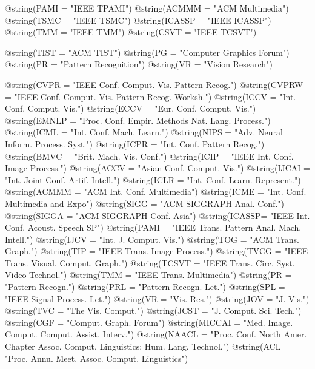@string(PAMI = "{IEEE TPAMI}")
@string(ACMMM	= "{ACM Multimedia}")
@string(TSMC = "{IEEE TSMC}")
@string(ICASSP = "{IEEE ICASSP}")
@string(TMM	= "{IEEE TMM}")
@string(CSVT = "{IEEE TCSVT}")

@string(TIST = "{ACM TIST}")
@string(PG = "{Computer Graphics Forum}")
@string(PR = "{Pattern Recognition}")
@string(VR = "{Vision Research}")

@string(CVPR  = "{IEEE Conf. Comput. Vis. Pattern Recog.}")
@string(CVPRW = "{IEEE Conf. Comput. Vis. Pattern Recog. Worksh.}")
@string(ICCV  = "{Int. Conf. Comput. Vis.}")
@string(ECCV  = "{Eur. Conf. Comput. Vis.}")
@string(EMNLP  = "{Proc. Conf. Empir. Methods Nat. Lang. Process.}")
@string(ICML  = "{Int. Conf. Mach. Learn.}")
@string(NIPS  = "{Adv. Neural Inform. Process. Syst.}")
@string(ICPR  = "{Int. Conf. Pattern Recog.}")
@string(BMVC  = "{Brit. Mach. Vis. Conf.}")
@string(ICIP  = "{IEEE Int. Conf. Image Process.}")
@string(ACCV  = "{Asian Conf. Comput. Vis.}")
@string(IJCAI = "{Int. Joint Conf. Artif. Intell.}")
@string(ICLR  = "{Int. Conf. Learn. Represent.}")
@string(ACMMM = "{ACM Int. Conf. Multimedia}")
@string(ICME  = "{Int. Conf. Multimedia and Expo}")
@string(SIGG  = "{ACM SIGGRAPH Anal. Conf.}")
@string(SIGGA = "{ACM SIGGRAPH Conf. Asia}")
@string(ICASSP=	"{IEEE Int. Conf. Acoust. Speech SP}")
@string(PAMI  = "{IEEE Trans. Pattern Anal. Mach. Intell.}")
@string(IJCV  = "{Int. J. Comput. Vis.}")
@string(TOG   = "{ACM Trans. Graph.}")
@string(TIP   = "{IEEE Trans. Image Process.}")
@string(TVCG  = "{IEEE Trans. Visual. Comput. Graph.}")
@string(TCSVT = "{IEEE Trans. Circ. Syst. Video Technol.}")
@string(TMM   = "{IEEE Trans. Multimedia}")
@string(PR    = "{Pattern Recogn.}")
@string(PRL    = "{Pattern Recogn. Let.}")
@string(SPL	  = "{IEEE Signal Process. Let.}")
@string(VR    = "{Vis. Res.}")
@string(JOV	  = "{J. Vis.}")
@string(TVC   = "{The Vis. Comput.}")
@string(JCST  = "{J. Comput. Sci. Tech.}")
@string(CGF   = "{Comput. Graph. Forum}")
@string(MICCAI   = "{Med. Image. Comput. Comput. Assist. Interv.}")
@string(NAACL = "{Proc. Conf. North Amer. Chapter Assoc. Comput. Linguistics: Hum. Lang. Technol.}")
@string(ACL   = "{Proc. Annu. Meet. Assoc. Comput. Linguistics}")

